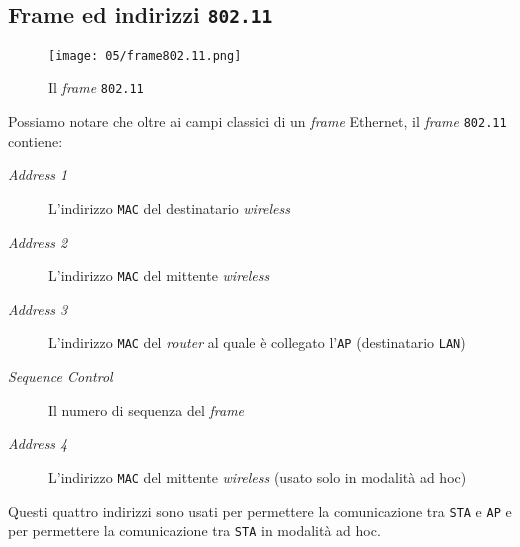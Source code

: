     \subsection{Frame ed indirizzi \texttt{802.11}}
        \begin{figure}[H]
            \centering
            \texttt{[image: 05/frame802.11.png]}
            \caption{Il \textit{frame} \texttt{802.11}}
        \end{figure}
        Possiamo notare che oltre ai campi classici di un \textit{frame} Ethernet, il \textit{frame} \texttt{802.11} contiene:
        \begin{description}
            \item[\textit{Address 1}] L'indirizzo \texttt{MAC} del destinatario \textit{wireless}
            \item[\textit{Address 2}] L'indirizzo \texttt{MAC} del mittente \textit{wireless}
            \item[\textit{Address 3}] L'indirizzo \texttt{MAC} del \textit{router} al quale è collegato l'\texttt{AP} (destinatario \texttt{LAN})
            \item[\textit{Sequence Control}] Il numero di sequenza del \textit{frame}
            \item[\textit{Address 4}] L'indirizzo \texttt{MAC} del mittente \textit{wireless} (usato solo in modalità ad hoc)
        \end{description}
        Questi quattro indirizzi sono usati per permettere la comunicazione tra \texttt{STA} e \texttt{AP} e per permettere la comunicazione tra \texttt{STA} in modalità ad hoc.